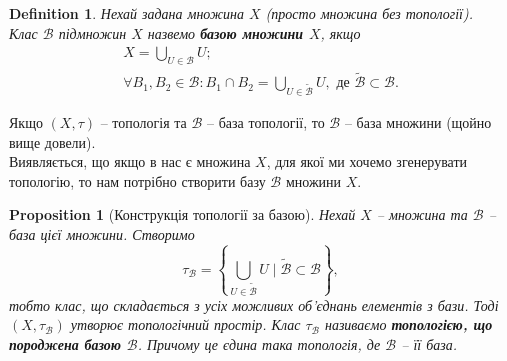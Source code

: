 \documentclass[a4paper, 10pt]{article}
\theoremstyle{theoremdd}
\newtheorem{definition}[theorem]{Definition}
\newtheorem{proposition}[theorem]{Proposition}
\begin{document}
\begin{definition}
Нехай задана множина $X$ (просто множина без топології).\\
Клас $\mathcal{B}$ підмножин $X$ назвемо \textbf{базою множини $X$}, якщо
\begin{align*}
X = \bigcup_{U \in \mathcal{B}} U; \\
\forall B_1,B_2 \in \mathcal{B}: B_1 \cap B_2 = \bigcup_{U \in \mathcal{\tilde{B}}} U, \text{ де } \mathcal{\tilde{B}} \subset \mathcal{B}.
\end{align*} 
\end{definition}
\noindent
Якщо $(X,\tau)$ -- топологія та $\mathcal{B}$ -- база топології, то $\mathcal{B}$ -- база множини (щойно вище довели).\\
Виявляється, що якщо в нас є множина $X$, для якої ми хочемо згенерувати топологію, то нам потрібно створити базу $\mathcal{B}$ множини $X$.

\begin{proposition}[Конструкція топології за базою]
Нехай $X$ -- множина та $\mathcal{B}$ -- база цієї множини. Створимо 
\begin{equation}
\label{eq:base_topology}
\tau_{\mathcal{B}} = \left\{ \displaystyle\bigcup_{U \in \mathcal{\mathcal{\tilde{B}}}} U \mid \mathcal{\tilde{B}} \subset \mathcal{B} \right\},
\end{equation}
тобто клас, що складається з усіх можливих об'єднань елементів з бази. Тоді $(X,\tau_{\mathcal{B}})$ утворює топологічний простір. Клас $\tau_{\mathcal{B}}$ називаємо \textbf{топологією, що породжена базою $\mathcal{B}$}. Причому це єдина така топологія, де $\mathcal{B}$ -- її база.
\end{proposition}
\end{document}
